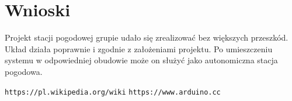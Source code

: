 \documentclass[polish, 11pt]{article}
\begin{document}
\vspace{1cm}
\section{Wnioski}
Projekt stacji pogodowej grupie udało się zrealizować bez większych przeszkód. Układ działa poprawnie i zgodnie z założeniami projektu. Po umieszczeniu systemu w odpowiedniej obudowie może on służyć jako autonomiczna stacja pogodowa. 

\vspace{1cm}
\begin{thebibliography}{99}

     \texttt{https://pl.wikipedia.org/wiki}
     \texttt{https://www.arduino.cc}
\end{thebibliography}
\end{document}
